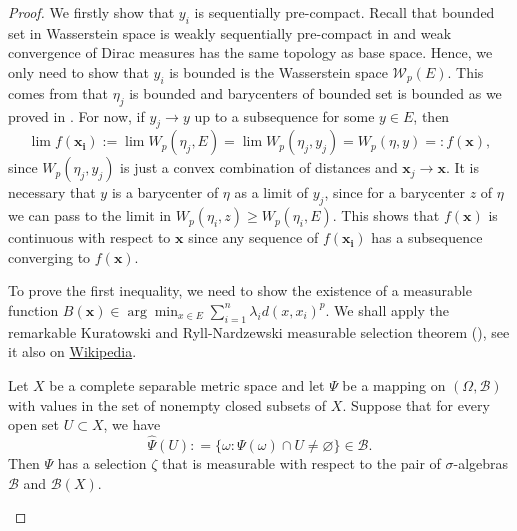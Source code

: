 \begin{proof}
	We firstly show that $y_i$ is sequentially pre-compact.
	Recall that bounded set in Wasserstein space is
	weakly sequentially pre-compact in 
	and weak convergence of Dirac measures has the same topology as base space.
	Hence, we only need to show that $y_i$ is bounded is the Wasserstein space $\mathcal{W}_p(E)$.
	This comes from that $\eta_j$ is bounded and barycenters of bounded set is bounded as we proved in .
	For now, if $y_j \rightarrow y$ up to a subsequence for some $y \in E$, then
	\[
		\lim f(\boldsymbol{x_i}) := \lim W_p(\eta_j, E) = \lim W_p(\eta_j, y_j) =  W_p(\eta, y) =: f(\boldsymbol{x}),
	\]
	since $W_p(\eta_j , y_j)$ is just a convex combination of distances and
	$\boldsymbol{x}_j \rightarrow \boldsymbol{x}$.
	It is necessary that $y$ is a barycenter of $\eta$ as a limit of $y_j$,
	since for a barycenter $z$ of $\eta$ we can pass to the limit in $W_p(\eta_i, z) \geq W_p(\eta_i, E)$.
	This shows that $f(\boldsymbol{x})$ is continuous with respect to $\boldsymbol{x}$ since
	any sequence of $f(\boldsymbol{x_i})$ has a subsequence converging to $f(\boldsymbol{x})$.

	To prove the first inequality,
	we need to show the existence of a measurable function $B(\boldsymbol{x}) \in \arg \min_{x \in E} \sum_{i=1}^{n} \lambda_i d(x, x_i)^p$.
	We shall apply the remarkable Kuratowski and Ryll-Nardzewski measurable selection theorem (\cite[Theorem 6.9.3]{Bogachev2007}),
	see it also on \href{https://en.wikipedia.org/wiki/Kuratowski_and_Ryll-Nardzewski_measurable_selection_theorem}{Wikipedia}.
	\begin{thm}
		Let \( X \) be a complete separable metric space and let \( \Psi \) be a mapping
		on \( ( \Omega , \mathcal { B } ) \) with values in the set of nonempty closed subsets of \( X \).
		Suppose that for every open set \( U \subset X \), we have
		\[ \widehat { \Psi } ( U ) : = \{ \omega : \Psi ( \omega ) \cap U \neq \varnothing \} \in \mathcal { B }. \]
		Then \( \Psi \) has a selection \( \zeta \) that is measurable with respect to
		the pair of \( \sigma \)-algebras \( \mathcal { B } \) and \( \mathcal { B } ( X ) \).
	\end{thm}


\end{proof}
